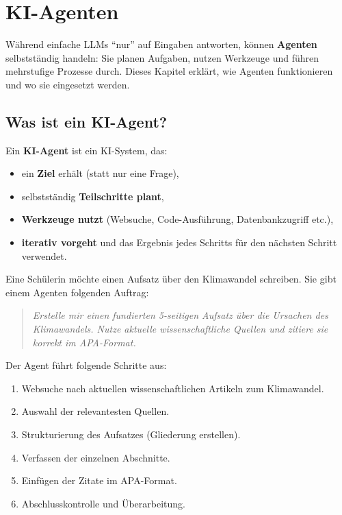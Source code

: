 \chapter{KI-Agenten}\label{ch:K05_Agenten}

\begin{myremark}
      Während einfache LLMs \enquote{nur} auf Eingaben antworten, können \textbf{Agenten}
      selbstständig handeln: Sie planen Aufgaben, nutzen Werkzeuge und führen mehrstufige
      Prozesse durch. Dieses Kapitel erklärt, wie Agenten funktionieren und wo sie
      eingesetzt werden.
\end{myremark}

\section{Was ist ein KI-Agent?}

\begin{mydefinition}
      Ein \textbf{KI-Agent} ist ein KI-System, das:
      \begin{itemize}
            \item ein \textbf{Ziel} erhält (statt nur eine Frage),
            \item selbstständig \textbf{Teilschritte plant},
            \item \textbf{Werkzeuge nutzt} (Websuche, Code-Ausführung, Datenbankzugriff etc.),
            \item \textbf{iterativ vorgeht} und das Ergebnis jedes Schritts für den
                  nächsten Schritt verwendet.
      \end{itemize}
\end{mydefinition}

\begin{myexample}
      Eine Schülerin möchte einen Aufsatz über den Klimawandel schreiben. Sie gibt
      einem Agenten folgenden Auftrag:

      \begin{quote}
            \textit{Erstelle mir einen fundierten 5-seitigen Aufsatz über die Ursachen
                  des Klimawandels. Nutze aktuelle wissenschaftliche Quellen und zitiere sie
                  korrekt im APA-Format.}
      \end{quote}

      Der Agent führt folgende Schritte aus:
      \begin{enumerate}
            \item Websuche nach aktuellen wissenschaftlichen Artikeln zum Klimawandel.
            \item Auswahl der relevantesten Quellen.
            \item Strukturierung des Aufsatzes (Gliederung erstellen).
            \item Verfassen der einzelnen Abschnitte.
            \item Einfügen der Zitate im APA-Format.
            \item Abschlusskontrolle und Überarbeitung.
      \end{enumerate}
\end{myexample}

